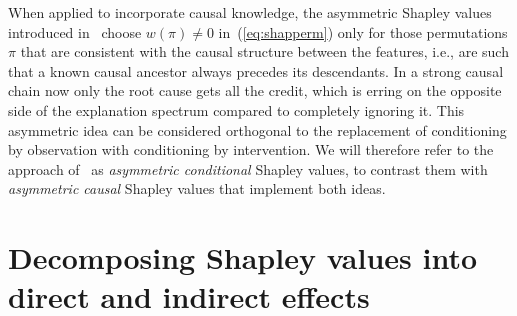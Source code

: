 \documentclass{article}
\newcommand{\vX}{\mathbf{X}}
\newcommand{\perm}{\pi}
\newcommand{\comment}[1]{{\color{red} #1}}
\begin{document}


When applied to incorporate causal knowledge, the asymmetric Shapley values introduced in~\cite{frye2019asymmetric} choose $w(\perm) \neq 0$ in~(\ref{eq:shapperm}) only for those permutations $\perm$ that are consistent with the causal structure between the features, i.e., are such that a known causal ancestor always precedes its descendants. In a strong causal chain now only the root cause gets all the credit, which is erring on the opposite side of the explanation spectrum compared to completely ignoring it.
This asymmetric idea can be considered orthogonal to the replacement of conditioning by observation with conditioning by intervention. We will therefore refer to the approach of~\cite{frye2019asymmetric} as {\em asymmetric conditional} Shapley values, to contrast them with {\em asymmetric causal} Shapley values that implement both ideas.

\section{Decomposing Shapley values into direct and indirect effects}
\end{document}
